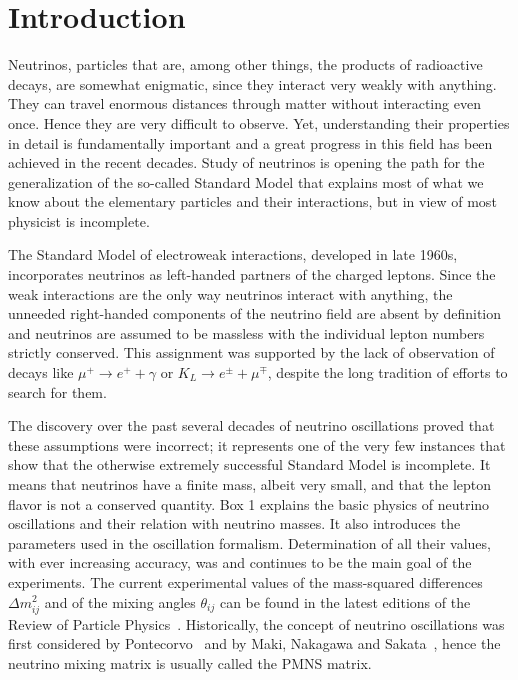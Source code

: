 \section{Introduction} 
\label{sec:intro}
Neutrinos, particles that are, among other things, the products of  radioactive decays, are somewhat enigmatic, since they interact very weakly with anything. 
They can travel enormous distances through matter without interacting even once. 
Hence they are very difficult to observe. 
Yet, understanding their properties in detail is fundamentally important and a great progress in this field has been achieved in the recent decades.   
Study of neutrinos is opening the path for the generalization of the so-called Standard Model that explains most of what we know about the elementary particles and their interactions, but in view of most physicist is incomplete.

The Standard Model of electroweak interactions,
developed in late 1960s, incorporates neutrinos as left-handed partners of the charged leptons. Since the weak interactions are the
only way neutrinos interact with anything, the unneeded right-handed components of the neutrino field are absent 
by definition and neutrinos are assumed to be massless with the individual lepton numbers strictly conserved.
This assignment was supported by the lack of observation of decays like 
$\mu^+ \rightarrow e^+ + \gamma$ or $K_L \rightarrow e^{\pm} + \mu^{\mp}$,
despite the long tradition of efforts to search for them.

The discovery over the past several decades
of neutrino oscillations proved that these assumptions were incorrect; it
represents one of the very few instances that show that the otherwise
extremely successful Standard Model is incomplete. It means that
neutrinos have a finite mass, albeit very small, and that the lepton flavor is not a conserved quantity.
Box 1 explains the basic physics of neutrino oscillations and their relation with neutrino masses. It
also introduces the parameters used in the oscillation formalism. Determination of all their values,
with ever increasing accuracy,
was and continues to be the main goal of the experiments.
The current experimental values of the mass-squared differences $\Delta m^2_{ij}$ and of the mixing angles $\theta_{ij}$ can be found
in the latest editions of the Review of Particle Physics~\cite{PDG14}.
Historically, the concept of neutrino oscillations was first considered by Pontecorvo~\cite{Pontecorvo57, Pontecorvo58}
and by Maki, Nakagawa and Sakata~\cite{MNS62}, hence the neutrino mixing matrix is usually called the PMNS matrix.

